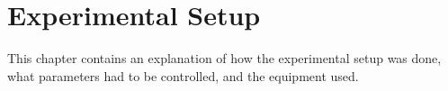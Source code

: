 \chapter{Experimental Setup}
\label{Chapter::Experimental Setup}
This chapter contains an explanation of how the experimental setup was done, what parameters had to be controlled, and the equipment used.

